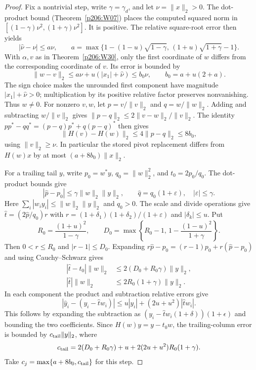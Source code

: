 \documentclass[11pt,oneside,openany]{book}
\theoremstyle{plain}
\theoremstyle{definition}
\theoremstyle{remark}
\begin{document}
\begin{proof}
Fix a nontrivial step, write \(\gamma=\gamma_d\), and let
\(\nu=\|x\|_2>0\). The dot-product bound
(Theorem~\ref{p206:W07}) places the computed squared norm in
\([(1-\gamma)\nu^2,(1+\gamma)\nu^2]\). It is positive.
The relative square-root error then yields
\[
 |\hat\nu-\nu|\le a\nu,\qquad
 a=\max\{1-(1-u)\sqrt{1-\gamma},\,
                     (1+u)\sqrt{1+\gamma}-1\}.
\]
With \(\alpha,v\) as in Theorem~\ref{p206:W30}, only the first
coordinate of \(w\) differs from the corresponding coordinate
of \(v\). Its error is bounded by
\[
 \|w-v\|_2\le a\nu+u(|x_1|+\hat\nu)\le b_0\nu,
 \qquad b_0=a+u(2+a).
\]
The sign choice makes the unrounded first component have
magnitude \(|x_1|+\hat\nu>0\); multiplication by its positive
relative factor preserves nonvanishing. Thus \(w\ne0\).
For nonzero \(v,w\), let \(p=v/\|v\|_2\) and \(q=w/\|w\|_2\).
Adding and subtracting \(w/\|v\|_2\) gives
\(\|p-q\|_2\le 2\|v-w\|_2/\|v\|_2\).
The identity \(pp^*-qq^*=(p-q)p^*+q(p-q)^*\) then gives
\[
   \|H(v)-H(w)\|_2\le4\|p-q\|_2\le8b_0,
\]
using \(\|v\|_2\ge\nu\). In particular the stored pivot replacement
differs from \(H(w)x\) by at most \((a+8b_0)\|x\|_2\).

For a trailing tail \(y\), write \(p_0=w^*y\),
\(q_0=\|w\|_2^2\), and \(t_0=2p_0/q_0\). The dot-product
bounds give
\[
 |\hat p-p_0|\le\gamma\|w\|_2\|y\|_2,\qquad
       \hat q=q_0(1+\varepsilon),\quad |\varepsilon|\le\gamma .
\]
Here \(\sum_i|w_i y_i|\le\|w\|_2\|y\|_2\) and \(q_0>0\).
The scale and divide operations give
\(\hat t=(2\hat p/q_0)r\) with
\(r=(1+\delta_1)(1+\delta_2)/(1+\varepsilon)\) and
\(|\delta_k|\le u\). Put
\[
 R_0=\frac{(1+u)^2}{1-\gamma},\qquad
 D_0=\max\left\{R_0-1,\,1-\frac{(1-u)^2}{1+\gamma}\right\}.
\]
Then \(0<r\le R_0\) and \(|r-1|\le D_0\). Expanding
\(r\hat p-p_0=(r-1)p_0+r(\hat p-p_0)\) and using Cauchy--Schwarz
gives
\[
 \begin{aligned}
  |\hat t-t_0|\|w\|_2&\le 2(D_0+R_0\gamma)\|y\|_2,\\
  |\hat t|\|w\|_2&\le 2R_0(1+\gamma)\|y\|_2 .
 \end{aligned}
\]
In each component the product and subtraction relative errors
give
\[
 |\hat y_i-(y_i-\hat t w_i)|
      \le u|y_i|+(2u+u^2)|\hat t w_i|.
\]
This follows by expanding the subtraction as
\((y_i-\hat t w_i(1+\delta))(1+\epsilon)\) and bounding the two
coefficients. Since \(H(w)y=y-t_0w\), the trailing-column
error is bounded by \(c_{\rm tail}\|y\|_2\), where
\[
   c_{\rm tail}
     =2(D_0+R_0\gamma)+u+2(2u+u^2)R_0(1+\gamma).
\]
Take \(c_j=\max\{a+8b_0,c_{\rm tail}\}\) for this step.


\end{proof}
\end{document}
